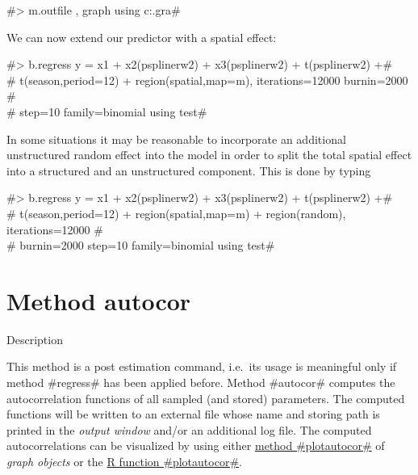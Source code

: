 #> m.outfile , graph using c:\maps\mapgraph.gra#

We can now extend our predictor with a spatial effect:

#> b.regress y = x1 + x2(psplinerw2) + x3(psplinerw2) + t(psplinerw2) +# \\
#  t(season,period=12) + region(spatial,map=m), iterations=12000 burnin=2000 #\\
#  step=10 family=binomial using test#

In some situations it may be reasonable to incorporate  an
additional unstructured  random effect into the model in order to
split the total spatial effect into a structured and an
unstructured component. This is done by typing

#> b.regress y = x1 + x2(psplinerw2) + x3(psplinerw2) + t(psplinerw2) +# \\
#  t(season,period=12) + region(spatial,map=m) + region(random), iterations=12000 #\\
#  burnin=2000 step=10 family=binomial using test#

\section{Method autocor}
\label{bayesautocorr} 
 

\begin{stanza}{Description}

This method is a post estimation command, i.e.~its usage is
meaningful only if method #regress# has been applied before. Method
#autocor# computes the autocorrelation functions of all sampled (and
stored) parameters. The computed functions will be written to an
external file whose name and storing path is printed in the {\em
output window} and/or an additional log file. The computed
autocorrelations can be visualized by using either
\hyperref[graphplotautocor]{method #plotautocor#} of {\em graph
objects} or the \hyperref[rpackage]{R function
#plotautocor#}.
\end{stanza}

